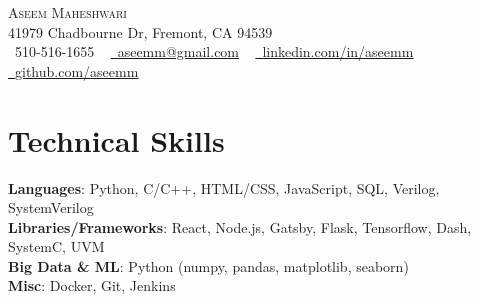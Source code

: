 \documentclass[letterpaper,11pt]{article}
\begin{document}

\begin{center}
    {\Huge \scshape Aseem Maheshwari} \\ \vspace{1pt}
    41979 Chadbourne Dr, Fremont, CA 94539 \\ \vspace{1pt}
    \small \raisebox{-0.1\height}\faPhone\ 510-516-1655 ~ \href{mailto:aseemm@gmail.com}{\raisebox{-0.2\height}\faEnvelope\  \underline{aseemm@gmail.com}} ~ 
    \href{https://linkedin.com/in/aseemm/}{\raisebox{-0.2\height}\faLinkedin\ \underline{linkedin.com/in/aseemm}}  ~
    \href{https://github.com/aseemm}{\raisebox{-0.2\height}\faGithub\ \underline{github.com/aseemm}}
    \vspace{-8pt}
\end{center}

\section{Technical Skills}
 \begin{itemize}[leftmargin=0.15in, label={}]
    \small{\item{
     \textbf{Languages}{: Python, C/C++, HTML/CSS, JavaScript, SQL, Verilog, SystemVerilog} \\
     \textbf{Libraries/Frameworks}{: React, Node.js, Gatsby, Flask, Tensorflow, Dash, SystemC, UVM} \\
     \textbf{Big Data \& ML}{: Python (numpy, pandas, matplotlib, seaborn)} \\
     \textbf{Misc}{: Docker, Git, Jenkins} \\
    }}
 \end{itemize}
 \vspace{-16pt}
\end{document}
